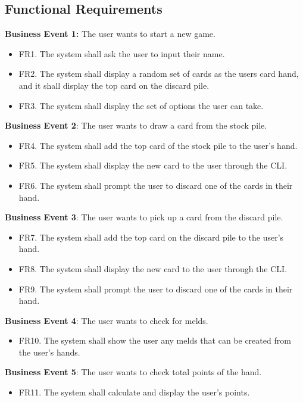 \documentclass[12pt, titlepage]{article}
\begin{document}
\subsection{Functional Requirements}
\textbf{Business Event 1:} The user wants to start a new game.
\begin{itemize}
    \item FR1. The system shall ask the user to input their name.
    \item FR2. The system shall display a random set of cards as the users card hand, and it shall display the top card on the discard pile.
    \item FR3. The system shall display the set of options the user can take.
\end{itemize}

\textbf{Business Event 2}: The user wants to draw a card from the stock pile.
\begin{itemize}
    \item FR4. The system shall add the top card of the stock pile to the user's hand.
    \item FR5. The system shall display the new card to the user through the CLI.
    \item FR6. The system shall prompt the user to discard one of the cards in their hand.
\end{itemize}

\textbf{Business Event 3}: The user wants to pick up a card from the discard pile.
\begin{itemize}
    \item FR7. The system shall add the top card on the discard pile to the user's hand.
    \item FR8. The system shall display the new card to the user through the CLI.
    \item FR9. The system shall prompt the user to discard one of the cards in their hand.
\end{itemize}

\textbf{Business Event 4}: The user wants to check for melds. 
\begin{itemize}
    \item FR10. The system shall show the user any melds that can be created from the user's hands.
\end{itemize}

\textbf{Business Event 5}: The user wants to check total points of the hand.
\begin{itemize}
    \item FR11. The system shall calculate and display the user's points.
\end{itemize}
\end{document}

